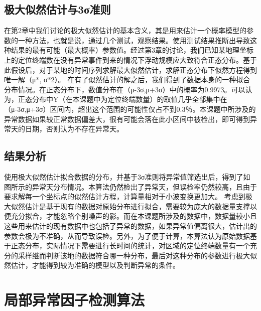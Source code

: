 \documentclass[a4paper,AutoFakeBold,oneside,12pt]{book}
\begin{document}
{{\subsection{极大似然估计与3σ准则}
在第2章中我们讨论的极大似然估计的基本含义，其是用来估计一个概率模型的参数的一种方法，也就是说，通过几个测试，观察结果。使用测试结果推断出导致这种结果的最有可能（最大概率）参数值。经过第3章的讨论，我们已知某地理坐标上的定位终端数在没有异常事件到来的情况下浮动规模应大致符合正态分布。基于此假设后，对于某地的时间序列求解最大似然估计，求解正态分布下似然方程得到唯一解（μ*, σ*2）。
	在有了似然估计的解之后，我们得到了数据本身的一种拟合分布情况。在正态分布下，数值分布在（μ-3σ,μ+3σ）中的概率为0.9973。可以认为，正态分布中Y（在本课题中为定位终端数量）的取值几乎全部集中在（μ-3σ,μ+3σ）区间内，超出这个范围的可能性仅占不到0.3％。本课题中所涉及的异常数据如果较正常数据偏差大，很有可能会落在此小区间中被检出，即可得到异常天的日期，否则认为不存在异常天。
\subsection{结果分析}
使用极大似然估计拟合数据的分布，并基于3σ准则将异常值筛选出后，得到了如图所示的异常天分布情况。本算法仍然检出了异常天，但误检率仍然较高，且由于要求解每一个坐标点的似然估计方程，计算量相对于小波变换更加大。
	考虑到极大似然估计是基于现有的数据对原始分布进行拟合，需要较为庞大的数据量支撑以便充分拟合，才能忽略个别噪声的影。而在本课题所涉及的数据中，数据量较小且这些用来估计的现有数据中也包括了异常的数据，如果异常值偏离很大，估计出的参数会极为不准确，从而导致误检。另外，为了便于计算，本算法认为原始数据基于正态分布，实际情况下需要进行长时间的统计，对区域的定位终端数量有一个充分的采样继而判断该地的数据符合哪一种分布，最后对这种分布的参数进行极大似然估计，才能得到较为准确的模型以及判断异常的条件。

\section{局部异常因子检测算法}
}}
\end{document}
